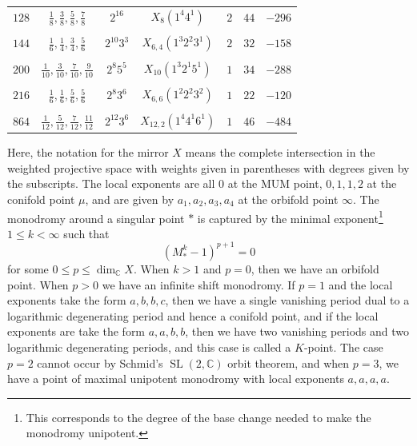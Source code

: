 \documentclass[10pt,oldfontcommands,oneside]{memoir}
\theoremstyle{definition}
\theoremstyle{remark}
\theoremstyle{plain}
\theoremstyle{definition}
\theoremstyle{remark}
\newcommand{\C}{\mathbb{C}}
\newcommand{\on}[1]{\operatorname{#1}}
\newcommand{\1}{\mathbf{1}}
\newcommand{\2}{\mathbf{2}}
\newcommand{\3}{\mathbf{3}}
\begin{document}
\begin{table}[htpb]
\begin{tabular}{ccccccc}
        $128$ & $\frac{1}{8},\frac{3}{8},\frac{5}{8},\frac{7}{8}$ & $2^{16}$ & $X_{8}(1^4 4^1)$ & $2$ & $44$ & $-296$ \\
        \\[-0.8em]
        $144$ & $\frac{1}{6},\frac{1}{4},\frac{3}{4},\frac{5}{6}$ & $2^{10}3^3$ & $X_{6,4}(1^3 2^2 3^1)$ & $2$ & $32$ & $-158$ \\
        \\[-0.8em]
        $200$ & $\frac{1}{10},\frac{3}{10},\frac{7}{10},\frac{9}{10}$ & $2^{8}5^5$ & $X_{10}(1^3 2^1 5^1)$ & $1$ & $34$ & $-288$ \\
        \\[-0.8em]
        $216$ & $\frac{1}{6},\frac{1}{6},\frac{5}{6},\frac{5}{6}$ & $2^{8}3^6$ & $X_{6,6}(1^2 2^2 3^2)$ & $1$ & $22$ & $-120$ \\
        \\[-0.8em]
        $864$ & $\frac{1}{12},\frac{5}{12},\frac{7}{12},\frac{11}{12}$ & $2^{12}3^6$ & $X_{12,2}(1^4 4^1 6^1)$ & $1$ & $46$ & $-484$ \\
        \bottomrule
    \end{tabular}
\end{table}
Here, the notation for the mirror $X$ means the complete intersection in the weighted projective space with weights given in parentheses with degrees given by the subscripts. The local exponents are all $0$ at the MUM point, $0,1,1,2$ at the conifold point $\mu$, and are given by $a_1, a_2, a_3, a_4$ at the orbifold point $\infty$. The monodromy around a singular point $*$ is captured by the minimal exponent\footnote{This corresponds to the degree of the base change needed to make the monodromy unipotent.} $1 \leq k < \infty$ such that
\[ (M_*^k-1)^{p+1} = 0 \]
for some $0 \leq p \leq \dim_{\C} X$. When $k > 1$ and $p=0$, then we have an orbifold point. When $p > 0$ we have an infinite shift monodromy. If $p=1$ and the local exponents take the form $a,b,b,c$, then we have a single vanishing period dual to a logarithmic degenerating period and hence a conifold point, and if the local exponents are take the form $a,a,b,b$, then we have two vanishing periods and two logarithmic degenerating periods, and this case is called a $K$-point. The case $p=2$ cannot occur by Schmid's $\on{SL}(2,\C)$ orbit theorem, and when $p=3$, we have a point of maximal unipotent monodromy with local exponents $a,a,a,a$.
\end{document}
